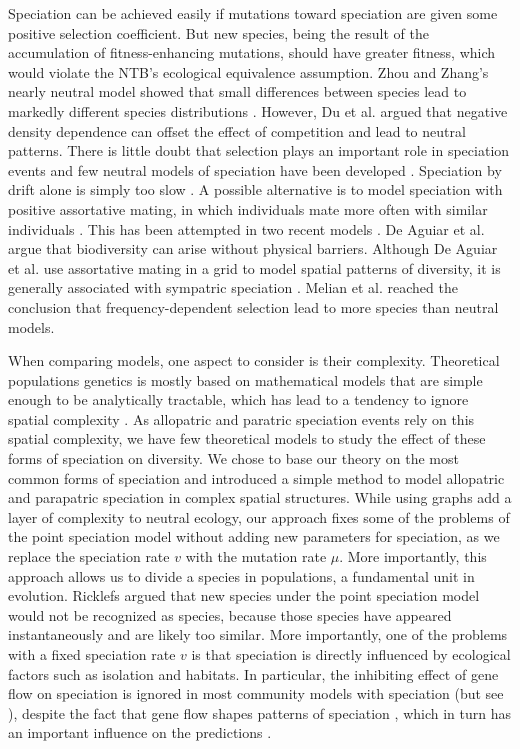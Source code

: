 \documentclass[letterpaper,twocolumn,superscriptaddress,showkeys]{revtex4}
\begin{document}
Speciation can be achieved easily if mutations toward speciation are given some positive selection coefficient. But new species, being the result of the accumulation of fitness-enhancing mutations, should have greater fitness, which would violate the NTB's ecological equivalence assumption. Zhou and Zhang's nearly neutral model showed that small differences between species lead to markedly different species distributions \cite{zho08}. However, Du et al. \cite{du_11} argued that negative density dependence can offset the effect of competition and lead to neutral patterns. There is little doubt that selection plays an important role in speciation events \cite{coy04} and few neutral models of speciation have been developed \cite{nei83}. Speciation by drift alone is simply too slow \cite{tur01}. A possible alternative is to model speciation with positive assortative mating, in which individuals mate more often with similar individuals \cite{fel81,coy04}. This has been attempted in two recent models \cite{dea09,mel10}. De Aguiar et al. \cite{dea09} argue that biodiversity can arise without physical barriers. Although De Aguiar et al. \cite{dea09} use assortative mating in a grid to model spatial patterns of diversity, it is generally associated with sympatric speciation \citep[p.130]{coy04}. Melian et al. \cite{mel10} reached the conclusion that frequency-dependent selection lead to more species than neutral models.

When comparing models, one aspect to consider is their complexity. Theoretical populations genetics is mostly based on mathematical models that are simple enough to be analytically tractable, which has lead to a tendency to ignore spatial complexity \cite{epp10}. As allopatric and paratric speciation events rely on this spatial complexity, we have few theoretical models to study the effect of these forms of speciation on diversity. We chose to base our theory on the most common forms of speciation and introduced a simple method to model allopatric and parapatric speciation in complex spatial structures. While using graphs add a layer of complexity to neutral ecology, our approach fixes some of the problems of the point speciation model without adding new parameters for speciation, as we replace the speciation rate $v$ with the mutation rate $\mu$. More importantly, this approach allows us to divide a species in populations, a fundamental unit in evolution. Ricklefs \cite{ric03} argued that new species under the point speciation model would not be recognized as species, because those species have appeared instantaneously and are likely too similar. More importantly, one of the problems with a fixed speciation rate $v$ is that speciation is directly influenced by ecological factors such as isolation and habitats. In particular, the inhibiting effect of gene flow on speciation is ignored in most community models with speciation \cite{hub01,vol05,eti07,ros10} (but see \cite{ros11}), despite the fact that gene flow shapes patterns of speciation \cite{coy04}, which in turn has an important influence on the predictions \cite{eti07,eti11}.
\end{document}
